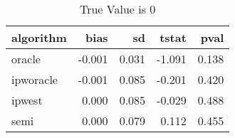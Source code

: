 \begin{table}[h!]
\caption{True Value is 0}
\centering
\begin{tabular}[t]{lrrrr}
\toprule
algorithm & bias & sd & tstat & pval\\
\midrule
oracle & -0.001 & 0.031 & -1.091 & 0.138\\
ipworacle & -0.001 & 0.085 & -0.201 & 0.420\\
ipwest & 0.000 & 0.085 & -0.029 & 0.488\\
semi & 0.000 & 0.079 & 0.112 & 0.455\\
\bottomrule
\end{tabular}
\end{table}
